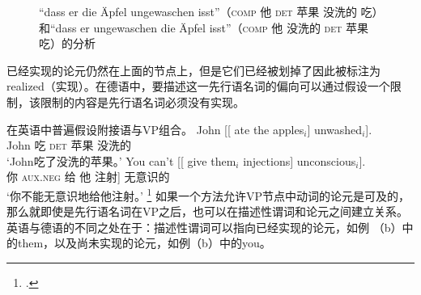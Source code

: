 \begin{figure}
\caption{“dass er die Äpfel ungewaschen isst”（\textsc{comp} 他 \textsc{det} 苹果 没洗的 吃）和“dass er ungewaschen die Äpfel isst”（\textsc{comp} 他 没洗的 \textsc{det} 苹果 吃）的分析}\label{anal-er-die-frau-nackt-sieht}
\end{figure}%
已经实现的论元仍然在上面的节点上，但是它们已经被划掉了因此被标注为realized（实现）。在德语中，要描述这一先行语名词的偏向可以通过假设一个限制，该限制的内容是先行语名词必须没有实现。

在英语中普遍假设附接语与VP组合。
\eal
\ex 
\gll John [[ ate the apples$_i$] unwashed$_i$].\\
	John {} 吃 \textsc{det} 苹果 没洗的\\
\glt `John吃了没洗的苹果。'
\ex 
\gll You can't [[ give them$_i$ injections] unconscious$_i$].\\
	你 \textsc{aux}.\textsc{neg} {} 给 他 注射] 无意识的\\
\glt `你不能无意识地给他注射。'
\footnote{%
.
}
\zl
如果一个方法允许VP节点中动词的论元是可及的，那么就即使是先行语名词在VP之后，也可以在描述性谓词和论元之间建立关系。英语与德语的不同之处在于：描述性谓词可以指向已经实现的论元，如例 （b）中的them，以及尚未实现的论元，如例（b）中的you。

